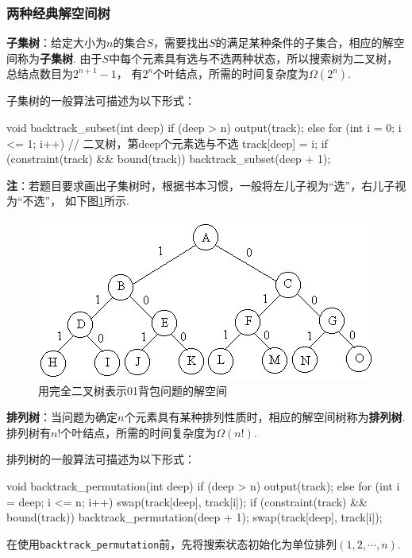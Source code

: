 \documentclass[12pt, a4paper, oneside]{ctexart}
\numberwithin{equation}{section}  %
\theoremstyle{definition}
\def\del{\vspace{-1.5ex}}   %
\begin{document}
\subsubsection{两种经典解空间树}
\textbf{子集树}：给定大小为$n$的集合$S$，需要找出$S$的满足某种条件的子集合，相应的解空间称为\textbf{子集树}. 
由于$S$中每个元素具有选与不选两种状态，所以搜索树为二叉树，总结点数目为$2^{n+1}-1$，
有$2^n$个叶结点，所需的时间复杂度为$\Omega(2^n)$.

子集树的一般算法可描述为以下形式：
\begin{cppcode}
void backtrack_subset(int deep) {
    if (deep > n) output(track);
    else {
        for (int i = 0; i <= 1; i++) {  // 二叉树，第deep个元素选与不选
            track[deep] = i;
            if (constraint(track) && bound(track))
                backtrack_subset(deep + 1);
        }
    }
}
\end{cppcode}
\textbf{注}：若题目要求画出子集树时，根据书本习惯，一般将左儿子视为“选”，右儿子视为“不选”，
如下图\ref{figure-子集树}所示.
\begin{figure}[htbp]
    \centering
    \includegraphics[scale=0.8]{01背包用完全二叉树表示解空间.png}
    \caption{用完全二叉树表示01背包问题的解空间}
    \label{figure-子集树}
\end{figure}

\textbf{排列树}：当问题为确定$n$个元素具有某种排列性质时，相应的解空间树称为\textbf{排列树}. 
排列树有$n!$个叶结点，所需的时间复杂度为$\Omega(n!)$.

排列树的一般算法可描述为以下形式：
\begin{cppcode}
void backtrack_permutation(int deep) {
    if (deep > n) output(track);
    else {
        for (int i = deep; i <= n; i++) {
            swap(track[deep], track[i]);
            if (constraint(track) && bound(track))
                backtrack_permutation(deep + 1);
            swap(track[deep], track[i]);
        }
    }
}
\end{cppcode}
在使用\texttt{backtrack\_permutation}前，先将搜索状态初始化为单位排列$(1,2,\cdots, n)$.
\del
\end{document}
